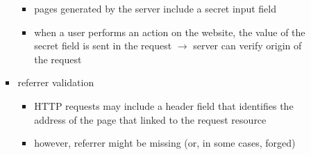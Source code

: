 \documentclass[final]{article}
\begin{document}
\begin{itemize}[nosep]
\begin{itemize}[nosep]
\begin{itemize}[nosep]
\begin{itemize}[nosep]
                                  \item pages generated by the server include a secret input field
                                  \item when a user performs an action on the website, the value of the secret field is sent in the request $\rightarrow$ server can verify origin of the request
                              \end{itemize}
                        \item referrer validation
                              \begin{itemize}[nosep]
                                  \item HTTP requests may include a header field that identifies the address of the page that linked to the request resource
                                  \item however, referrer might be missing (or, in some cases, forged)
                              \end{itemize}
                    \end{itemize}
          \end{itemize}
\end{itemize}
\end{document}
